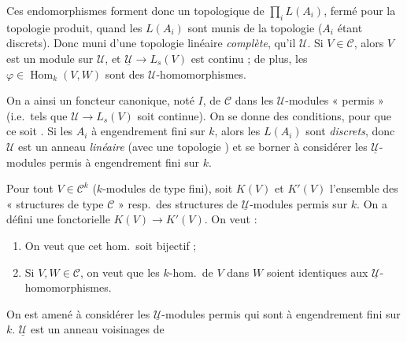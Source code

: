 \documentclass[11pt,a4paper]{article}
\begin{document}
Ces endomorphismes forment donc un \ill{}  topologique de
$\prod_{i} L(A_{i})$, fermé pour la topologie produit, quand les $L(A_{i})$ sont
munis de la topologie \ill{} ($A_{i}$ étant discrets). Donc \ill{} muni d'une
topologie \struck{\ill{}} linéaire \ill{} \emph{complète}, qu'il \ill{}
$\mathcal{U}$. Si $V \in \mathcal{C}$, alors $V$ est un module sur $\mathcal{U}$,
et $\underline{\mathcal{U}} \to L_{s}(V)$ est continu ; de plus, les
$\varphi \in \operatorname{Hom}_{k}(V, W)$ sont des $\mathcal{U}$-homomorphismes.
\ill{}


\struck{\ill{}} On a ainsi un foncteur canonique, noté $I$, de $\mathcal{C}$ dans
les $\mathcal{U}$-modules « permis » (i.e.\ tels que
$\mathcal{U} \to L_{s}(V)$ soit continue). On se donne des conditions, pour que
ce soit  . Si \ill{} les $A_{i}$ à
engendrement fini sur $k$, alors les $L(A_{i})$ sont \emph{discrets}, donc
$\mathcal{U}$ est un anneau \ill{} \emph{linéaire} \ill{} (avec une topologie
\ill{}) et \ill{} se borner à considérer les $\underline{\mathcal{U}}$-modules
permis à engendrement fini sur \struck{\ill{}} $k$. \ill{}

\struck{\ill{}}



Pour tout $V \in \mathcal{C}^{k}$ ($k$-modules de type fini), soit $K(V)$ et
$K'(V)$ l'ensemble des « structures de type $\mathcal{C}$ » resp.\ des structures
de $\underline{\mathcal{U}}$-modules permis sur $k$. On a défini une \ill{}
fonctorielle $K(V) \longrightarrow K'(V)$. On veut :
\begin{enumerate}
\item[1°)] On veut que cet hom.\ soit bijectif ;
\item[2°)] Si $V, W \in \mathcal{C}$, on veut que les $k$-hom.\ de $V$ dans $W$
      soient identiques aux $\underline{\mathcal{U}}$-homomorphismes.
\end{enumerate}

On est amené à considérer les $\underline{\mathcal{U}}$-modules permis qui sont à
engendrement fini sur $k$. $\underline{\mathcal{U}}$ est un anneau
  \ill{} voisinages de
\ill{} \struck{\ill{}}
\end{document}

